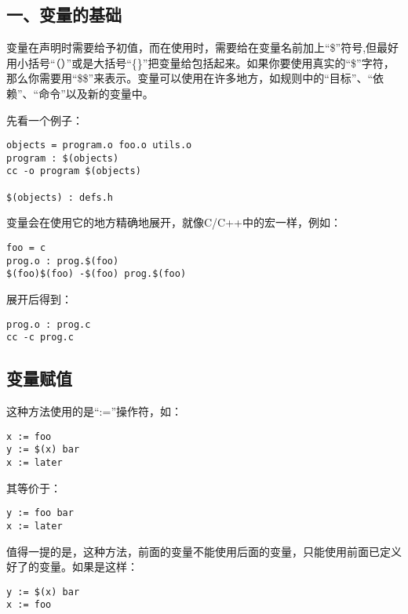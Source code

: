 \documentclass[]{book}
\begin{document}
\hypertarget{ux4e00ux53d8ux91cfux7684ux57faux7840}{%
\subsection{一、变量的基础}\label{ux4e00ux53d8ux91cfux7684ux57faux7840}}

变量在声明时需要给予初值，而在使用时，需要给在变量名前加上``\$''符号,但最好用小括号``（）''或是大括号``\{\}''把变量给包括起来。如果你要使用真实的``\$''字符，那么你需要用``\$\$''来表示。变量可以使用在许多地方，如规则中的``目标''、``依赖''、``命令''以及新的变量中。

先看一个例子：

\begin{verbatim}
objects = program.o foo.o utils.o
program : $(objects)
cc -o program $(objects)

$(objects) : defs.h
\end{verbatim}

变量会在使用它的地方精确地展开，就像C/C++中的宏一样，例如：

\begin{verbatim}
foo = c
prog.o : prog.$(foo)
$(foo)$(foo) -$(foo) prog.$(foo)
\end{verbatim}

展开后得到：

\begin{verbatim}
prog.o : prog.c
cc -c prog.c
\end{verbatim}

\hypertarget{ux53d8ux91cfux8d4bux503c}{%
\subsection{变量赋值}\label{ux53d8ux91cfux8d4bux503c}}

这种方法使用的是``:=''操作符，如：

\begin{verbatim}
x := foo
y := $(x) bar
x := later
\end{verbatim}

其等价于：

\begin{verbatim}
y := foo bar
x := later
\end{verbatim}

值得一提的是，这种方法，前面的变量不能使用后面的变量，只能使用前面已定义好了的变量。如果是这样：

\begin{verbatim}
y := $(x) bar
x := foo
\end{verbatim}
\end{document}
